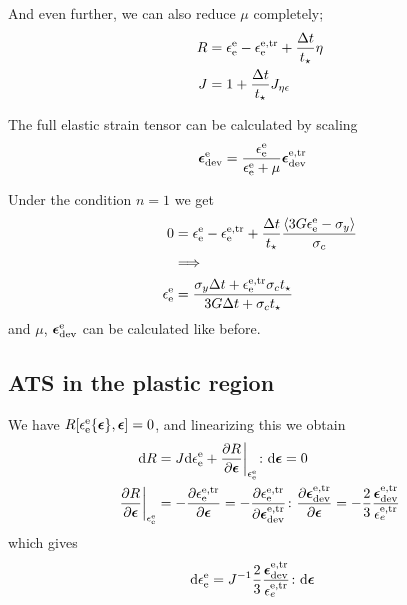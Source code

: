 \documentclass[a4paper,11pt]{article}
\newcommand{\ts}[1]{\text{\boldmath $#1$}}
\newcommand{\pderiv}[2]{\frac{\partial #1}{\partial #2}}
\newcommand{\dev}{{\rm dev}}
\newcommand{\rmd}{{\rm d}}
\newcommand{\rme}{{\rm e}}
\begin{document}
And even further, we can also reduce $\mu$ completely;
\begin{align}
	R &= \epsilon_\rme^\rme -\epsilon^{\rm e,tr}_\rme + \frac{\Delta t}{t_\star}\eta\\
	J &= 1 + \frac{\Delta t}{t_\star}J_{\eta\epsilon}
\end{align}

The full elastic strain tensor can be calculated by scaling 
\begin{align}
	\ts\epsilon_\dev^\rme &= \frac{\epsilon_\rme^\rme}{\epsilon_\rme^\rme+\mu} \ts\epsilon^{\rm e,tr}_\dev
\end{align}

Under the condition $n=1$ we get 
\begin{align}
	0 &= \epsilon_\rme^\rme - \epsilon_\rme^{\rm e,tr} + \frac{\Delta t}{t_\star} \frac{\langle 3 G \epsilon_\rme^\rme - \sigma_y \rangle}{\sigma_c}\\
\nonumber &\Longrightarrow\\
	\epsilon_\rme^\rme &= \frac{\sigma_y\Delta t + \epsilon_\rme^{\rm e,tr}\sigma_c t_\star}{3 G \Delta t + \sigma_c t_\star}
\end{align}
and $\mu$, $\ts\epsilon_\dev^\rme$ can be calculated like before.

\subsection{ATS in the plastic region}
We have $R[\epsilon_\rme^\rme\{\ts\epsilon\},\ts\epsilon] = 0$, and linearizing this we obtain
\begin{align}
	\rmd R &= J \rmd\epsilon_\rme^\rme + \pderiv{R}{\ts\epsilon}\bigg|_{\epsilon_\rme^\rme}\colon\rmd\ts\epsilon = 0\\	
	\pderiv{R}{\ts\epsilon}\bigg|_{\epsilon_\rme^\rme} &= -\pderiv{\epsilon_\rme^{\rme,\rm tr}}{\ts\epsilon} = 
		-\pderiv{\epsilon_\rme^{\rme,\rm tr}}{\ts\epsilon_\dev^{\rme,\rm tr}}\colon\pderiv{\ts\epsilon_\dev^{\rme,\rm tr}}{\ts\epsilon} = 
		-\frac23\frac{\ts\epsilon_\dev^{\rme,\rm tr}}{\epsilon_e^{\rme,\rm tr}}
\end{align}
which gives
\begin{align}
	\rmd\epsilon_\rme^\rme &= 
		J^{-1}\frac23\frac{\ts\epsilon_\dev^{\rme,\rm tr}}{\epsilon_e^{\rme,\rm tr}}\colon\rmd\ts\epsilon
\end{align}
\end{document}
